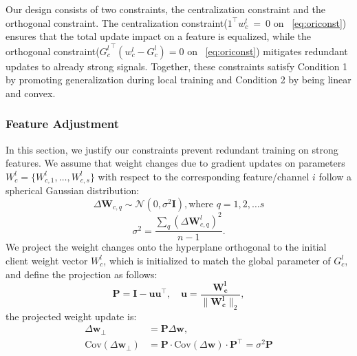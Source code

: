 \documentclass{article}
\theoremstyle{plain}
\theoremstyle{definition}
\theoremstyle{remark}
\begin{document}
Our design consists of two constraints, the centralization constraint and the orthogonal constraint. The centralization constraint($1^\top w_c^l\ =\ 0$ on ~\cref{eq:oriconst}) ensures that the total update impact on a feature is equalized, while the orthogonal constraint(${G_c^l}^\top (w_c^l - G_c^l)=0$ on ~\cref{eq:oriconst}) mitigates redundant updates to already strong signals. Together, these constraints satisfy Condition 1 by promoting generalization during local training and Condition 2 by being linear and convex.

\subsubsection{Feature Adjustment}
In this section, we justify our constraints prevent redundant training on strong features. We assume that weight changes due to gradient updates on parameters $W_{c}^{l}=\{ W_{c,1}^{l}, \ldots, W_{c,s}^{l} \}$ with respect to the corresponding feature/channel $i$ follow a spherical Gaussian distribution:
\begin{equation}
\Delta \bm{W}_{c,q} \sim \mathcal{N}\left(0, \sigma^2 \bm{I}\right), \text{where } q=1,2,\ldots s
\end{equation}
\begin{equation}
\sigma^2 = \frac{\sum_q \left(\Delta\bm{W}_{c,q}^{l}\right)^2}{n-1}.
\end{equation}
We project the weight changes onto the hyperplane orthogonal to the initial client weight vector \( W_c^l \), which is initialized to match the global parameter of \( G_c^l \), and define the projection as follows:
\begin{equation}
\bm{P} = \bm{I} - \bm{u}\bm{u}^\top, \quad \bm{u} = \frac{\bm{W_c^l}}{\|\bm{W_c^l}\|_2},
\end{equation}
the projected weight update is:
\begin{equation}
\begin{aligned}
\Delta \bm{w}_\perp &= \bm{P} \Delta \bm{w}, \\
\text{Cov}(\Delta \bm{w}_\perp) &= \bm{P} \cdot \text{Cov}(\Delta \bm{w}) \cdot \bm{P}^\top = \sigma^2 \bm{P}
\end{aligned}
\end{equation}
\end{document}
